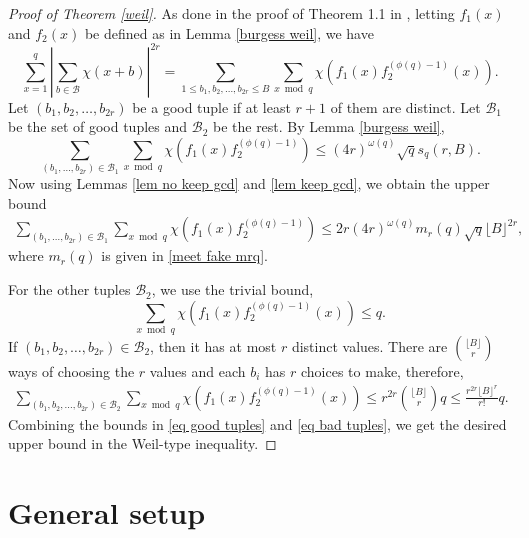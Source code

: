 \documentclass[12pt]{amsart}
\theoremstyle{plain}
\theoremstyle{definition}
\newcommand{\cB}{{\mathcal{B}}}
\begin{document}
\begin{proof}[Proof of Theorem \ref{weil}]
As done in the proof of Theorem 1.1 in \cite{ET1}, letting $f_1(x)$ and $f_2(x)$ be defined as in Lemma \ref{burgess weil}, we have
\begin{equation*}\label{poly}
\sum_{x=1}^q\left|\sum_{b\in\mathcal{B}}\chi(x+b)\right|^{2r}= \sum_{1\le b_1,b_2,\ldots,b_{2r}\le B}\sum_{x\bmod{q}}\chi(f_1(x)f_2^{(\phi(q)-1)}(x)).
\end{equation*}
Let $(b_1,b_2,\ldots,b_{2r})$ be a good tuple if at least $r+1$ of them are distinct. Let $\cB_1$ be the set of good tuples and $\cB_2$ be the rest. By Lemma \ref{burgess weil},
$$\sum_{(b_1,\ldots,b_{2r})\in \cB_1}\sum_{x\bmod{q}}\chi(f_1(x)f_2^{(\phi(q)-1)}) \le (4r)^{\omega(q)}\sqrt{q} s_q(r, B).$$
Now using Lemmas \ref{lem no keep gcd} and \ref{lem keep gcd}, we obtain the upper bound
\begin{align}\label{eq good tuples}
  \sum_{(b_1,\ldots,b_{2r})\in \cB_1}\sum_{x\bmod{q}}\chi(f_1(x)f_2^{(\phi(q)-1)})\le 2r(4r)^{\omega(q)}m_r(q)\sqrt{q}\lfloor B\rfloor^{2r},  
\end{align}
where $m_r(q)$ is given in \eqref{meet fake mrq}.

For the other tuples $\cB_2$, we use the trivial bound,  
$$\sum_{x\bmod{q}} \chi(f_1(x)f_2^{(\phi(q)-1)}(x)) \le q.$$
If $(b_1, b_2,\ldots, b_{2r}) \in \cB_2$, then it has at most $r$ distinct values. There are $\binom{\lfloor B\rfloor}{r}$ ways of choosing the $r$ values and each $b_i$ has $r$ choices to make, therefore, 
\begin{align}\label{eq bad tuples}
    \sum_{(b_1,b_2,\ldots,b_{2r})\in \cB_2}\sum_{x\bmod{q}}\chi(f_1(x)f_2^{(\phi(q)-1)}(x)) \le r^{2r} \binom{\lfloor B\rfloor}{r} q \le \frac{r^{2r} \lfloor B\rfloor^r}{r!}q.
\end{align}
Combining the bounds in \eqref{eq good tuples} and \eqref{eq bad tuples}, we get the desired upper bound in the Weil-type inequality.
\end{proof}


\section{General setup}\label{General setup}
\end{document}
